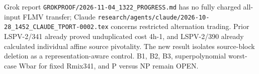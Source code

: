 \documentclass{article}
\begin{document}
Grok report \verb|GROKPROOF/2026-11-04_1322_PROGRESS.md| has no fully charged all-input FLMV transfer; Claude \verb|research/agents/claude/2026-10-28_1452_CLAUDE_TPORT-0002.tex| concerns restricted alternation trading. Prior LSPV-2/341 already proved unduplicated cost 4h-1, and LSPV-2/390 already calculated individual affine source pivotality. The new result isolates source-block deletion as a representation-aware control. B1, B2, B3, superpolynomial worst-case Wbar for fixed Rmix341, and P versus NP remain OPEN.
\end{document}
